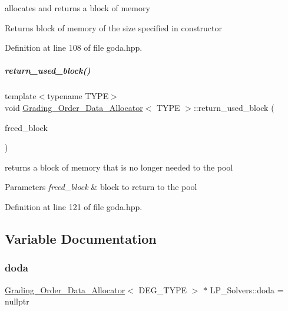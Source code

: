 allocates and returns a block of memory 

\begin{DoxyReturn}{Returns}
block of memory of the size specified in constructor 
\end{DoxyReturn}


Definition at line 108 of file goda.\+hpp.

\mbox{\label{group__memorygroup_a518a8f61da93ea93651f426e12761a07}} 
\subparagraph{\texorpdfstring{return\+\_\+used\+\_\+block()}{return\_used\_block()}}
{\footnotesize\ttfamily template$<$typename T\+Y\+PE$>$ \\
void \hyperlink{group__memorygroup_class_grading___order___data___allocator}{Grading\+\_\+\+Order\+\_\+\+Data\+\_\+\+Allocator}$<$ T\+Y\+PE $>$\+::return\+\_\+used\+\_\+block (\begin{DoxyParamCaption}\item[{T\+Y\+PE $\ast$}]{freed\+\_\+block }\end{DoxyParamCaption})\hspace{0.3cm}{\ttfamily [inline]}}



returns a block of memory that is no longer needed to the pool 


\begin{DoxyParams}{Parameters}
{\em freed\+\_\+block} & block to return to the pool \\
\hline
\end{DoxyParams}


Definition at line 121 of file goda.\+hpp.



\subsection{Variable Documentation}
\mbox{\label{group__memorygroup_ga0dc763860167cb9a6e5c84bfda9a456e}} 
\subsubsection{\texorpdfstring{doda}{doda}}
{\footnotesize\ttfamily \hyperlink{group__memorygroup_class_grading___order___data___allocator}{Grading\+\_\+\+Order\+\_\+\+Data\+\_\+\+Allocator}$<$ D\+E\+G\+\_\+\+T\+Y\+PE $>$ $\ast$ L\+P\+\_\+\+Solvers\+::doda = nullptr}



